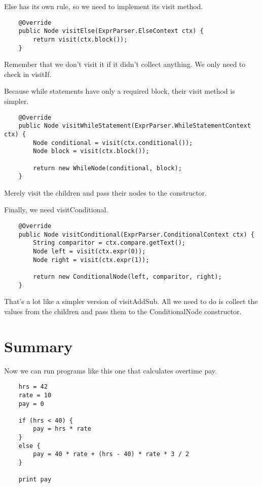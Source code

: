 Else has its own rule, so we need to implement its visit method.

{\footnotesize
\begin{verbatim}
    @Override
    public Node visitElse(ExprParser.ElseContext ctx) {
        return visit(ctx.block());
    }
\end{verbatim}
}

Remember that we don't visit it if it didn't collect anything. We only need
to check in visitIf.

Because while statements have only a required block, their visit method is simpler.

{\footnotesize
\begin{verbatim}
    @Override
    public Node visitWhileStatement(ExprParser.WhileStatementContext ctx) {
        Node conditional = visit(ctx.conditional());
        Node block = visit(ctx.block());

        return new WhileNode(conditional, block);
    }
\end{verbatim}
}

Merely visit the children and pass their nodes to the constructor.

Finally, we need visitConditional.

{\footnotesize
\begin{verbatim}
    @Override
    public Node visitConditional(ExprParser.ConditionalContext ctx) {
        String comparitor = ctx.compare.getText();
        Node left = visit(ctx.expr(0));
        Node right = visit(ctx.expr(1));

        return new ConditionalNode(left, comparitor, right);
    }
\end{verbatim}
}

That's a lot like a simpler version of visitAddSub. All we need to do is collect
the values from the children and pass them to the ConditionalNode constructor.

\section{Summary}

Now we can run programs like this one that calculates overtime pay.

{\footnotesize
\begin{verbatim}
    hrs = 42
    rate = 10
    pay = 0

    if (hrs < 40) {
        pay = hrs * rate
    }
    else {
        pay = 40 * rate + (hrs - 40) * rate * 3 / 2
    }

    print pay
\end{verbatim}
}

